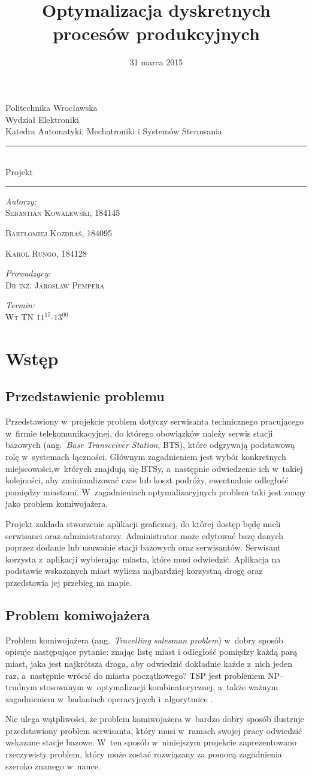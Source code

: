 \documentclass[12pt,a4paper]{report}
\title{Optymalizacja dyskretnych procesów produkcyjnych}
\date{31 marca 2015}
\makeatletter
\newcommand{\linia}{\rule{\linewidth}{0.4mm}}
\renewcommand{\maketitle}{\begin{titlepage}
    \vspace*{1cm}
    
    \begin{center}\small
    Politechnika Wrocławska\\
    Wydział Elektroniki\\
    Katedra Automatyki, Mechatroniki i Systemów Sterowania
    \end{center}
    
    \vspace{3cm}
    
    \noindent\linia
    \begin{center}
      \Huge \textsc{\@title} \\
      \Large Projekt
    \end{center}
    \linia
    
    \vspace{0.5cm}
    
    \begin{flushright}
    \begin{minipage}{6.5cm}
    \textit{\small Autorzy:}\\
    \normalsize \textsc{Sebastian Kowalewski, 184145} \par
    \normalsize \textsc{Bartłomiej Kozdraś, 184095} \par
    \normalsize \textsc{Karol Rungo, 184128} \par
    \vspace{0.5cm}
    \textit{\small Prowadzący:}\\
    \normalsize \textsc{Dr inż. Jarosław Pempera} \par
    \vspace{0.5cm}
    \textit{\small Termin:}\\
    \normalsize \textsc{Wt TN $11^{15}$-$13^{00}$} \par
    \end{minipage}
    \end{flushright}    
     
    \vspace*{\stretch{6}}
    
    \begin{center}
    \@date
    \end{center}
    
    \newpage
	\thispagestyle{empty}
	\mbox{}
  \end{titlepage}%
}
\makeatother
\begin{document}
\maketitle	
\tableofcontents


\chapter{Wstęp}

\section{Przedstawienie problemu}
Przedstawiony w~projekcie problem dotyczy serwisanta technicznego pracującego w~firmie telekomunikacyjnej, do którego obowiązków należy serwis stacji bazowych (ang.~\textit{Base Transceiver Station}, BTS), które odgrywają podstawową rolę w~systemach łączności. Głównym zagadnieniem jest wybór konkretnych miejscowości,w~których znajdują się BTSy, a~następnie odwiedzenie ich w~takiej kolejności, aby zminimalizować czas lub koszt podróży, ewentualnie odległość pomiędzy miastami. W~zagadnieniach optymalizacyjnych problem taki jest znany jako problem komiwojażera.

Projekt zakłada stworzenie aplikacji graficznej, do której dostęp będę mieli serwisanci oraz administratorzy. Administrator może edytować bazę danych poprzez dodanie lub usuwanie stacji bazowych oraz serwisantów. Serwisant korzysta z~aplikacji wybierając miasta, które musi odwiedzić. Aplikacja na podstawie wskazanych miast wylicza najbardziej korzystną drogę oraz przedstawia jej przebieg na mapie. 

\section{Problem komiwojażera}
Problem komiwojażera (ang.~\textit{Travelling salesman problem}) w~dobry sposób opisuje następujące pytanie: znając listę miast i odległość pomiędzy każdą parą miast, jaka jest najkrótsza droga, aby odwiedzić dokładnie każde z~nich jeden raz, a~następnie wrócić do miasta początkowego? TSP jest problemem NP--trudnym stosowanym w~optymalizacji kombinatorycznej, a~także ważnym zagadnieniem w~badaniach operacyjnych i~algorytmice \cite{TSP_Wiki}. 

Nie ulega wątpliwości, że problem komiwojażera w~bardzo dobry sposób ilustruje przedstawiony problem serwisanta, który musi w~ramach swojej pracy odwiedzić wskazane stacje bazowe. W~ten sposób w~niniejszym projekcie zaprezentowano rzeczywisty problem, który może zostać rozwiązany za pomocą zagadnienia szeroko znanego w~nauce.
\end{document}
